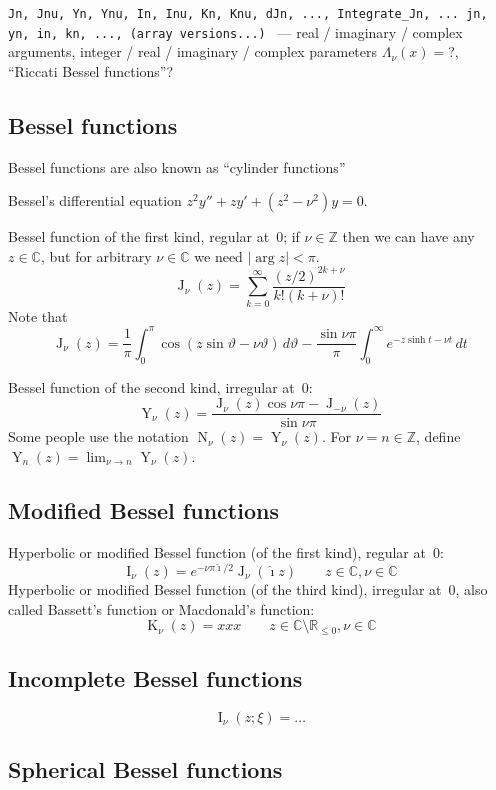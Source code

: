 \documentclass[10pt,dvipdfmx,letterpaper,twoside]{article}
\let\O=\operatorname
\newcommand{\RR}{{\mathbb{R}}}
\newcommand{\CC}{{\mathbb{C}}}
\newcommand{\ZZ}{{\mathbb{Z}}}
\newcommand{\ii}{{\hat{\imath}}}
\let\theta=\vartheta
\begin{document}
{\tt Jn, Jnu, Yn, Ynu, In, Inu, Kn, Knu, dJn, ..., Integrate\_Jn, ...
jn, yn, in, kn, ..., (array versions...)
} --- real / imaginary / complex arguments, integer / real / imaginary / complex parameters
$\Lambda_\nu(x) = $?, ``Riccati Bessel functions''?

\subsection{Bessel functions}
Bessel functions are also known as ``cylinder functions''

Bessel's differential equation $z^2 y'' + z y' + (z^2-\nu^2) y = 0$.

Bessel function of the first kind, regular at~$0$; if $\nu\in\ZZ$ then we can have any $z\in\CC$, but
for arbitrary $\nu\in\CC$ we need $|\arg z|<\pi$.
\[ \O{J}_\nu(z) = \sum_{k=0}^\infty\frac{(z/2)^{2k+\nu}}{k!(k+\nu)!} \]
Note that
\[ \O{J}_\nu(z) = \frac{1}{\pi}\int_0^\pi\cos(z \sin\theta - \nu\theta)\,d\theta
  - \frac{\sin \nu\pi}{\pi}\int_0^\infty e^{-z \sinh t - \nu t}\,dt \]

Bessel function of the second kind, irregular at~$0$:
\[ \O{Y}_\nu(z) = \frac{\O{J}_\nu(z)\cos\nu\pi - \O{J}_{-\nu}(z)}{\sin \nu\pi} \]
Some people use the notation $\O{N}_\nu(z) = \O{Y}_\nu(z)$.
For $\nu=n\in\ZZ$, define $\O{Y}_n(z) = \lim_{\nu\to n}\O{Y}_\nu(z)$.

\subsection{Modified Bessel functions}

Hyperbolic or modified Bessel function (of the first kind), regular at~$0$:
\[ \O{I}_\nu(z) = e^{-\nu\pi\ii/2} \O{J}_\nu(\ii z) \qquad z\in\CC, \nu\in\CC \]
Hyperbolic or modified Bessel function (of the third kind), irregular at~$0$, also called Bassett's function or Macdonald's function:
\[ \O{K}_\nu(z) = xxx \qquad z\in\CC\setminus\RR_{\leq0}, \nu\in\CC \]

\subsection{Incomplete Bessel functions}

\[ \O{I}_\nu(z; \xi) = \dots \]

\subsection{Spherical Bessel functions}
\end{document}
